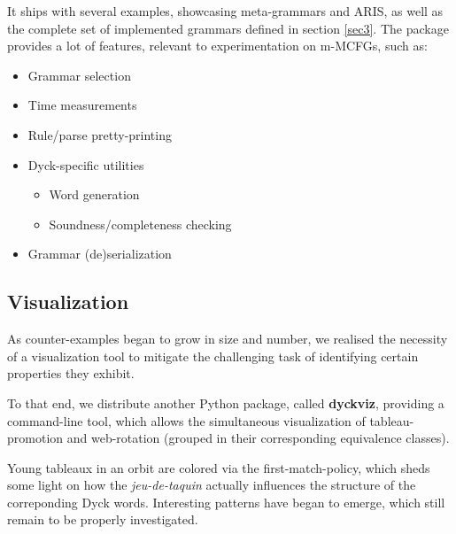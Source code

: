 \documentclass[nonatbib,numbers,10pt]{sigplanconf}
\begin{document}
It ships with several examples, showcasing meta-grammars and \textsc{ARIS}, as well as the complete set of implemented grammars defined in section \ref{sec3}. The package provides a lot of features, relevant to experimentation on m-MCFGs, such as:
\begin{itemize}
\item Grammar selection
\item Time measurements
\item Rule/parse pretty-printing
\item Dyck-specific utilities
	\begin{itemize}
	\item Word generation
	\item Soundness/completeness checking
	\end{itemize}
\item Grammar (de)serialization
\end{itemize}

\subsection{Visualization}
As counter-examples began to grow in size and number, we realised the necessity of a visualization tool to mitigate the challenging task of identifying certain properties they exhibit.

To that end, we distribute another Python package, called \textbf{dyckviz}, providing a command-line tool, which allows the simultaneous visualization of tableau-promotion and web-rotation (grouped in their corresponding equivalence classes).

Young tableaux in an orbit are colored via the first-match-policy, which sheds some light on how the \textit{jeu-de-taquin} actually influences the structure of the correponding Dyck words. Interesting patterns have began to emerge, which still remain to be properly investigated.
\end{document}
